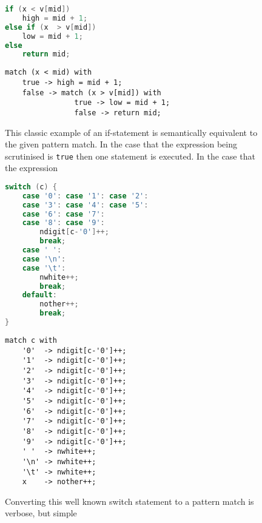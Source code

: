 \documentclass[acmsmall]{acmart}
\begin{document}
\begin{figure}
\hspace{-2em}
\begin{minipage}[t]{0.35\linewidth}
\begin{lstlisting}[language=C]
if (x < v[mid])
    high = mid + 1;
else if (x  > v[mid])
    low = mid + 1;           
else  
    return mid;
\end{lstlisting}
\end{minipage}
\begin{minipage}[t]{0.65\linewidth}
\begin{lstlisting}
match (x < mid) with
    true -> high = mid + 1;
    false -> match (x > v[mid]) with
                true -> low = mid + 1;
                false -> return mid;
\end{lstlisting}
\end{minipage}
\caption{This classic example of an if-statement \cite{kernighan_c_1988} is semantically equivalent to the given pattern match.  In the case that the expression being scrutinised is \lstinline{true} then one statement is executed.  In the case that the expression}
\label{fig:kar_if}
\end{figure}

\begin{figure}
\begin{minipage}[t]{0.45\linewidth}
\begin{lstlisting}[language=C]
switch (c) {
    case '0': case '1': case '2': 
    case '3': case '4': case '5': 
    case '6': case '7': 
    case '8': case '9':
        ndigit[c-'0']++;
        break;
    case ' ': 
    case '\n': 
    case '\t':
        nwhite++;
        break;
    default:
        nother++;
        break;
}
\end{lstlisting}
\end{minipage}
\begin{minipage}[t]{0.45\linewidth}
\begin{lstlisting}
match c with
    '0'  -> ndigit[c-'0']++;
    '1'  -> ndigit[c-'0']++;
    '2'  -> ndigit[c-'0']++;
    '3'  -> ndigit[c-'0']++;
    '4'  -> ndigit[c-'0']++;
    '5'  -> ndigit[c-'0']++;
    '6'  -> ndigit[c-'0']++;
    '7'  -> ndigit[c-'0']++;
    '8'  -> ndigit[c-'0']++;
    '9'  -> ndigit[c-'0']++;
    ' '  -> nwhite++;
    '\n' -> nwhite++;
    '\t' -> nwhite++;
    x    -> nother++;
\end{lstlisting}
\end{minipage}
\caption{Converting this well known switch statement \cite{kernighan_c_1988} to a pattern match is verbose, but simple}
\label{fig:kar_switch}
\end{figure}
\end{document}
